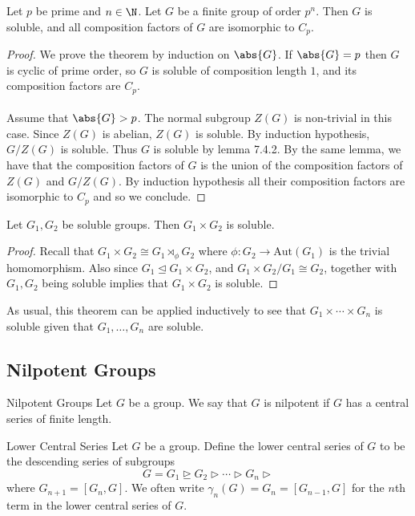 \documentclass[a4paper]{article}
\begin{document}
\begin{thm}{}{} Let $p$ be prime and $n\in\N$. Let $G$ be a finite group of order $p^n$. Then $G$ is soluble, and all composition factors of $G$ are isomorphic to $C_p$. \tcbline
\begin{proof}
We prove the theorem by induction on $\abs{G}$. If $\abs{G}=p$ then $G$ is cyclic of prime order, so $G$ is soluble of composition length $1$, and its composition factors are $C_p$. \\~\\

Assume that $\abs{G}>p$. The normal subgroup $Z(G)$ is non-trivial in this case. Since $Z(G)$ is abelian, $Z(G)$ is soluble. By induction hypothesis, $G/Z(G)$ is soluble. Thus $G$ is soluble by lemma 7.4.2. By the same lemma, we have that the composition factors of $G$ is the union of the composition factors of $Z(G)$ and $G/Z(G)$. By induction hypothesis all their composition factors are isomorphic to $C_p$ and so we conclude. 
\end{proof}
\end{thm}

\begin{thm}{}{} Let $G_1,G_2$ be soluble groups. Then $G_1\times G_2$ is soluble. \tcbline
\begin{proof}
Recall that $G_1\times G_2\cong G_1\rtimes_\phi G_2$ where $\phi:G_2\to\text{Aut}(G_1)$ is the trivial homomorphism. Also since $G_1\trianglelefteq G_1\times G_2$, and $G_1\times G_2/G_1\cong G_2$, together with $G_1,G_2$ being soluble implies that $G_1\times G_2$ is soluble. 
\end{proof}
\end{thm}

As usual, this theorem can be applied inductively to see that $G_1\times\cdots\times G_n$ is soluble given that $G_1,\dots,G_n$ are soluble. 


\subsection{Nilpotent Groups}
\begin{defn}{Nilpotent Groups}{} Let $G$ be a group. We say that $G$ is nilpotent if $G$ has a central series of finite length. 
\end{defn}

\begin{defn}{Lower Central Series}{} Let $G$ be a group. Define the lower central series of $G$ to be the descending series of subgroups $$G=G_1\trianglerighteq G_2\triangleright\cdots\triangleright G_n\triangleright$$ where $G_{n+1}=[G_n,G]$. We often write $\gamma_n(G)=G_n=[G_{n-1},G]$ for the $n$th term in the lower central series of $G$. 
\end{defn}
\end{document}

